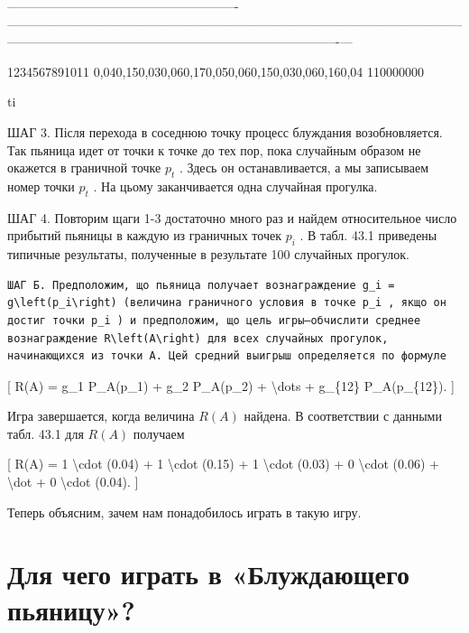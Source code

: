 \documentclass[
]{article}
\begin{document}
\textbar-------------------------------------------------------\textbar---------------------------------------------------------------------------------------------------\textbar----------------------------------------------------------------------------------------\textbar--\textbar--\textbar{}

1234567891011 \textbar{}
0,040,150,030,060,170,050,060,150,030,060,160,04 \textbar{} 110000000
\textbar{} \textbar{} \textbar{}

ti

ШАГ 3. Після перехода в соседнюю точку процесс блуждания возобновляется.
Так пьяница идет от точки к точке до тех пор, пока случайным образом не
окажется в граничной точке \(p_t\) . Здесь он останавливается, а мы
записываем номер точки \(p_t\) . На цьому заканчивается одна случайная
прогулка.

ШАГ 4. Повторим щаги 1-3 достаточно много раз и найдем относительное
число прибытий пьяницы в каждую из граничных точек \(p_i\) . В табл.
43.1 приведены типичные результаты, полученные в результате 100
случайных прогулок.

\begin{verbatim}
ШАГ Б. Предположим, що пьяница получает вознаграждение g_i = g\left(p_i\right) (величина граничного условия в точке p_i , якщо он достиг точки p_i ) и предположим, що цель игры—обчислити среднее вознаграждение R\left(A\right) для всех случайных прогулок, начинающихся из точки A. Цей средний выигрыш определяется по формуле
\end{verbatim}

{[} R(A) = g\_1 P\_A(p\_1) + g\_2 P\_A(p\_2) + \textbackslash dots +
g\_\{12\} P\_A(p\_\{12\}). {]}

Игра завершается, когда величина \(R\left(A\right)\) найдена. В
соответствии с данными табл. 43.1 для \(R\left(A\right)\) получаем

{[} R(A) = 1 \textbackslash cdot (0.04) + 1 \textbackslash cdot (0.15) +
1 \textbackslash cdot (0.03) + 0 \textbackslash cdot (0.06) +
\textbackslash dot + 0 \textbackslash cdot (0.04). {]}

Теперь объясним, зачем нам понадобилось играть в такую игру.

\section{Для чего играть в «Блуждающего
пьяницу»?}\label{ux434ux43bux44f-ux447ux435ux433ux43e-ux438ux433ux440ux430ux442ux44c-ux432-ux431ux43bux443ux436ux434ux430ux44eux449ux435ux433ux43e-ux43fux44cux44fux43dux438ux446ux443}
\end{document}
